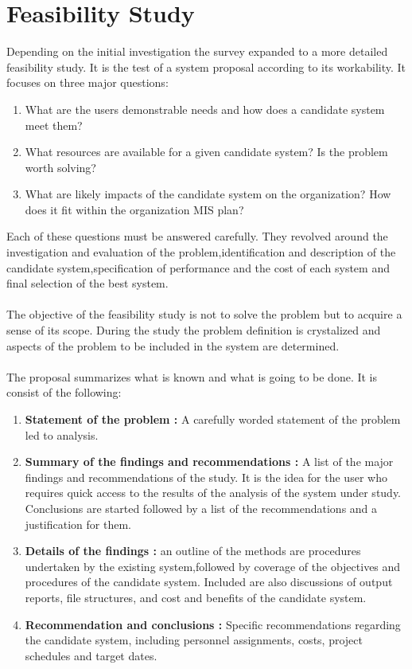 \documentclass[a4paper,12pt]{report}
\begin{document}
\section{Feasibility Study}
Depending on the initial investigation the survey expanded to a more detailed feasibility study. It is the test of a system proposal according to its workability. It focuses on three major questions:
\begin{enumerate}
	\item 	What are the users demonstrable needs and how does a candidate system meet them?
	\item	What resources are available for a given candidate system? Is the problem worth solving?
	\item	What are likely impacts of the candidate system on the organization? How does it fit within the organization MIS plan?
	\end{enumerate}
Each of these questions must be answered carefully. They revolved around the investigation and evaluation of the problem,identification and description of the candidate system,specification of performance and the cost of each system and final selection of the best system.\\ \\

The objective of the feasibility study is not to solve the problem but to acquire a sense of its scope. During the study the problem definition is crystalized and aspects of the problem to be included in the system are determined.\\ \\

The proposal summarizes what is known and what is going to be done. It is consist of the following:
\begin{enumerate}
	\item \textbf{Statement of the problem :} A carefully worded statement of the problem led to analysis.
	
	\item \textbf{	Summary of the findings and recommendations :} A list of the major findings and recommendations of the study. It is the idea for the user who requires quick access to the results of the analysis of the system under study. Conclusions are started followed by a list of the recommendations and a justification for them.
	
	\item \textbf{ Details of the findings :} an outline of the methods are procedures undertaken by the existing system,followed by coverage of the objectives and procedures of the candidate system. Included are also discussions of output reports, file structures, and cost and benefits of the candidate system.
	
	\item \textbf{	Recommendation and conclusions :} Specific recommendations regarding the candidate system, including personnel assignments, costs, project schedules and target dates.
\end{enumerate}
\end{document}
